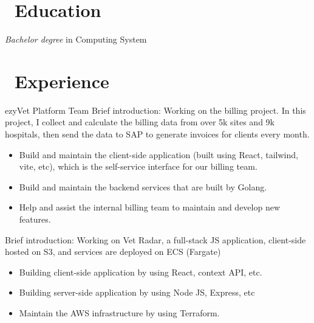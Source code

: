 \documentclass{resume}
\begin{document}



\section{\faGraduationCap\ Education}
\textit{Bachelor degree} in Computing System

\section{\faUsers\ Experience}
\role{Senior Software Engineer} {ezyVet Platform Team}
Brief introduction: Working on the billing project. In this project, I collect and calculate the billing data from over 5k sites and 9k hospitals, then send the data to SAP to generate invoices for clients every month.
\begin{itemize}
  \item Build and maintain the client-side application (built using React, tailwind, vite, etc), which is the self-service interface for our billing team.
  \item Build and maintain the backend services that are built by Golang.
  \item Help and assist the internal billing team to maintain and develop new features.
\end{itemize}

Brief introduction: Working on Vet Radar, a full-stack JS application, client-side hosted on S3, and services are deployed on ECS (Fargate)
\begin{itemize}
  \item Building client-side application by using React, context API, etc.
  \item Building server-side application by using Node JS, Express, etc
  \item Maintain the AWS infrastructure by using Terraform.
\end{itemize}
\end{document}
